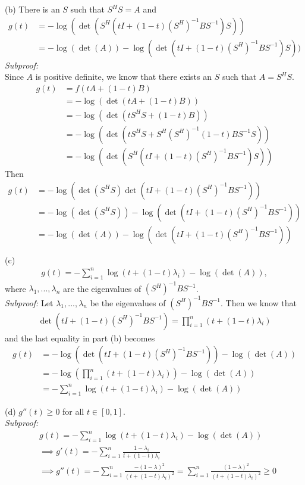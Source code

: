 \documentclass[letterpaper,12pt]{article}
\theoremstyle{definition}
\begin{document}
(b) There is an $S$ such that $S^HS = A$ and
\begin{align*}
  g(t)
  &= -\log(\det(S^H(tI + (1-t)(S^H)^{-1}BS^{-1})S)) \\
  &= -\log(\det(A)) - \log(\det(tI + (1-t)(S^H)^{-1}BS^{-1})S))
\end{align*}
\textit{Subproof:} \\
Since $A$ is positive definite, we know that there exists an $S$ such that $A = S^HS$.
\begin{align*}
  g(t) &= f(tA + (1-t)B)
  \\
  &= -\log(\det(tA + (1-t)B))
  \\
  &= -\log(\det(tS^HS + (1-t)B))
  \\
  &= -\log(\det(tS^HS + S^H(S^H)^{-1}(1-t)BS^{-1}S))
  \\
  &= -\log(\det(S^H(tI + (1-t)(S^H)^{-1}BS^{-1})S))
\end{align*}
Then
\begin{align*}
  g(t) &= -\log(\det(S^HS)\det(tI + (1-t)(S^H)^{-1}BS^{-1}))
  \\
  &= -\log(\det(S^HS)) -\log(\det(tI + (1-t)(S^H)^{-1}BS^{-1}))
  \\
  &= -\log(\det(A)) -\log(\det(tI + (1-t)(S^H)^{-1}BS^{-1}))
\end{align*}

(c)
\begin{align*}
  g(t) = - \sum_{i=1}^n \log(t+(1-t)\lambda_i) - \log(\det(A)),
\end{align*}
where $\lambda_1, ..., \lambda_n$ are the eigenvalues of $(S^H)^{-1}BS^{-1}$. \\
\textit{Subproof:}
Let $\lambda_1, ..., \lambda_n$ be the eigenvalues of $(S^H)^{-1}BS^{-1}$. Then we know that
\begin{align*}
  \det(tI + (1-t)(S^H)^{-1}BS^{-1}) = \prod_{i=1}^n(t + (1-t)\lambda_i)
\end{align*}
and the last equality in part (b) becomes
\begin{align*}
  g(t) &= -\log(\det(tI + (1-t)(S^H)^{-1}BS^{-1})) -\log(\det(A))
  \\
  &= -\log(\prod_{i=1}^n(t + (1-t)\lambda_i)) -\log(\det(A))
  \\
  &= -\sum_{i=1}^n\log(t + (1-t)\lambda_i) -\log(\det(A))
\end{align*}

(d) $g''(t) \geq 0$ for all $t \in [0,1]$. \\
\textit{Subproof:} \\
\begin{align*}
  &g(t) = -\sum_{i=1}^n\log(t + (1-t)\lambda_i) -\log(\det(A))
  \\
  &\implies g'(t) = -\sum_{i=1}^n \frac{1-\lambda_i}{t+(1-t)\lambda_i}
  \\
  &\implies g''(t) = -\sum_{i=1}^n \frac{-(1-\lambda)^2}{(t+(1-t)\lambda_i)^2} = \sum_{i=1}^n \frac{(1-\lambda)^2}{(t+(1-t)\lambda_i)^2} \geq 0
\end{align*}
\end{document}
